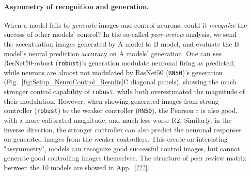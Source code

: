 \documentclass{article}
\newcommand{\red}[1]{\textcolor{red}{#1}}
\theoremstyle{plain}
\theoremstyle{definition}
\theoremstyle{remark}
\begin{document}
\paragraph{Asymmetry of recognition and generation.}
When a model fails to \textit{generate} images and control neurons, could it \textit{recognize} the success of other models' control?
In the so-called \textit{peer-review} analysis, we send the accentuation images generated by A model to B model, and evaluate the B model's neural prediction accuracy on A models' generation. One can see ResNet50-robust (\texttt{robust})'s generation modulate neuronal firing as predicted; while neurons are almost not modulated by ResNet50 (\texttt{RN50})'s generation (Fig.~\ref{fig:Setup_NeuroControl_Results}C diagonal panels), showing the much stronger control capability of \texttt{robust}, while both overestimated the magnitude of their modulation. 
However, when showing generated images from strong controller (\texttt{robust}) to the weaker controller (\texttt{RN50}), the Pearson r is also good, with a more calibrated magnitude, and much less worse R2. 
Similarly, in the inverse direction, the stronger controller can also predict the neuronal responses on generated images from the weaker controllers. 
This create an interesting "assymmetry", models can recognize good successful control images, but cannot generate good controlling images themselves. 
The structure of peer review matrix between the 10 models are showed in App.~\ref{???}.

\end{document}
